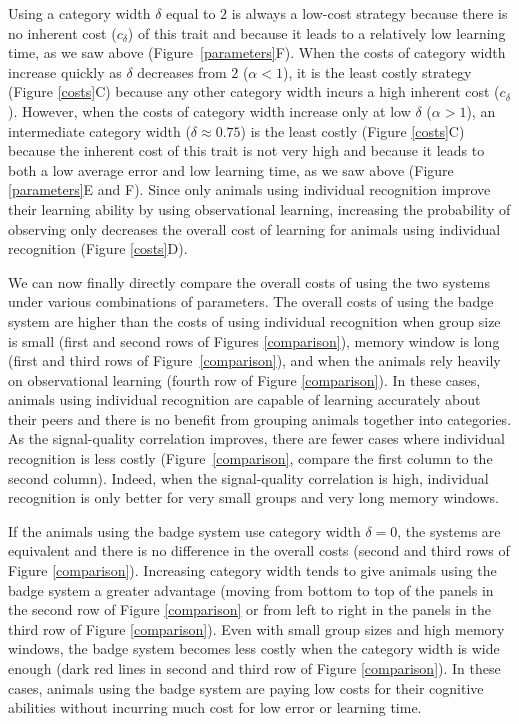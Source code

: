 Using a category width $\delta$ equal to $2$ is always a low-cost strategy because there is no inherent cost ($c_\delta$) of this trait and because it leads to a relatively low learning time, as we saw above (Figure~\ref{parameters}F).  When the costs of category width increase quickly as $\delta$ decreases from $2$ ($\alpha<1$), it is the least costly strategy (Figure \ref{costs}C) because any other category width incurs a high inherent cost ($c_\delta$). However, when the costs of category width increase only at low $\delta$ ($\alpha>1$), an intermediate category width ($\delta\approx 0.75$) is the least costly (Figure \ref{costs}C) because the inherent cost of this trait is not very high and because it leads to both a low average error and low learning time, as we saw above (Figure \ref{parameters}E and F). Since only animals using individual recognition improve their learning ability by using observational learning, increasing the probability of observing only decreases the overall cost of learning for animals using individual recognition (Figure \ref{costs}D). 

We can now finally directly compare the overall costs of using the two systems under various combinations of parameters. The overall costs of using the badge system are higher than the costs of using individual recognition when group size is small (first and second rows of Figures \ref{comparison}), memory window is long (first and third rows of Figure~\ref{comparison}), and when the animals rely heavily on observational learning (fourth row of Figure \ref{comparison}). In these cases, animals using individual recognition are capable of learning accurately about their peers and there is no benefit from grouping animals together into categories. As the signal-quality correlation improves, there are fewer cases where individual recognition is less costly (Figure~\ref{comparison}, compare the first column to the second column). Indeed, when the signal-quality correlation is high, individual recognition is only better for very small groups and very long memory windows. 

If the animals using the badge system use category width $\delta=0$, the systems are equivalent and there is no difference in the overall costs (second and third rows of Figure \ref{comparison}). Increasing category width tends to give animals using the badge system a greater advantage (moving from bottom to top of the panels in the second row of Figure \ref{comparison} or from left to right in the panels in the third row of Figure \ref{comparison}). Even with small group sizes and high memory windows, the badge system becomes less costly when the category width is wide enough (dark red lines in second and third row of Figure \ref{comparison}). In these cases, animals using the badge system are paying low costs for their cognitive abilities without incurring much cost for low error or learning time.

